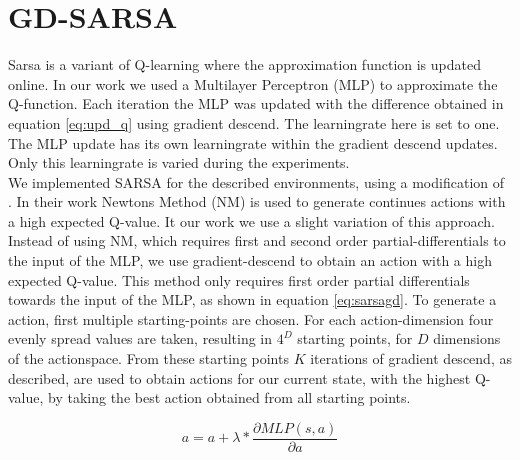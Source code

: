 
\section{GD-SARSA}
Sarsa is a variant of Q-learning where the approximation function is updated online. In our work we used a Multilayer Perceptron (MLP) to approximate the Q-function. Each iteration the MLP was updated with the difference obtained in equation \eqref{eq:upd_q} using gradient descend. The learningrate here is set to one. The MLP update has its own learningrate within the gradient descend updates. Only this learningrate is varied during the experiments. \\
\newline
We implemented SARSA for the described environments, using a modification of \cite{nichols2015continuous}. In their work Newtons Method (NM) is used to generate continues actions with a high expected Q-value.
It our work we use a slight variation of this approach. Instead of using NM, which requires first and second order partial-differentials to the input of the MLP, we use gradient-descend to obtain an action with a high expected Q-value. This method only requires first order partial differentials towards the input of the MLP, as shown in equation \eqref{eq:sarsagd}.
To generate a action, first multiple starting-points are chosen. For each action-dimension four evenly spread values are taken, resulting in $4 ^ D$ starting points, for $D$ dimensions of the actionspace. From these starting points $K$ iterations of gradient descend, as described, are used to obtain actions for our current state, with the highest Q-value, by taking the best action obtained from all starting points.


\begin{equation}
\label{eq:sarsagd}
a = a + \lambda * \frac{\partial MLP(s,a)}{\partial a}
\end{equation}
